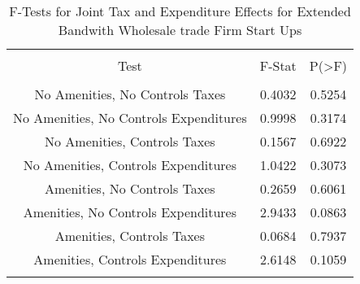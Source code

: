 
\begin{table}[!htbp] \centering 
  \caption{F-Tests for Joint Tax and Expenditure Effects for Extended Bandwith Wholesale trade Firm Start Ups} 
  \label{42Ftests} 
\begin{tabular}{@{\extracolsep{5pt}} ccc} 
\\[-1.8ex]\hline 
\hline \\[-1.8ex] 
Test & F-Stat & P(\textgreater F) \\ 
\hline \\[-1.8ex] 
No Amenities, No Controls Taxes & 0.4032 & 0.5254 \\ 
No Amenities, No Controls Expenditures & 0.9998 & 0.3174 \\ 
No Amenities, Controls Taxes & 0.1567 & 0.6922 \\ 
No Amenities, Controls Expenditures & 1.0422 & 0.3073 \\ 
Amenities, No Controls Taxes & 0.2659 & 0.6061 \\ 
Amenities, No Controls Expenditures & 2.9433 & 0.0863 \\ 
Amenities, Controls Taxes & 0.0684 & 0.7937 \\ 
Amenities, Controls Expenditures & 2.6148 & 0.1059 \\ 
\hline \\[-1.8ex] 
\end{tabular} 
\end{table} 
